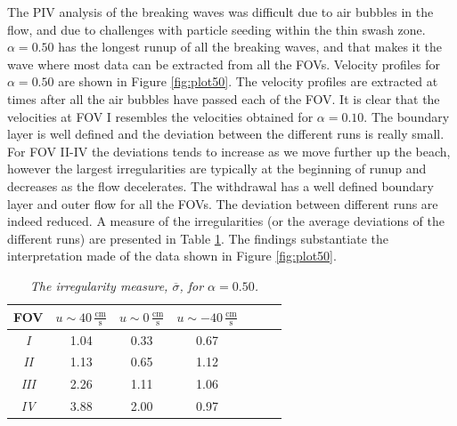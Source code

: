 \documentclass[review, authoryear]{elsarticle}
\newcommand{\cmbps}{\,\frac{\mbox{cm}}{\mbox{s}}}
\begin{document}
The PIV analysis of the breaking waves was difficult due to air bubbles in the flow, and due to challenges with particle seeding within the thin swash zone.  $\alpha=0.50$ has the longest runup of all the breaking waves, and that makes it the wave where most data can be extracted from all the FOVs. Velocity profiles for $\alpha=0.50$ are shown in Figure \ref{fig:plot50}. The velocity profiles are extracted at times after all the air bubbles have passed each of the FOV. It is clear that the velocities at FOV I resembles the velocities obtained for $\alpha=0.10$. The boundary layer is well defined and the deviation between the different runs is really small. For FOV II-IV the deviations tends to increase as we move further up the beach, however the largest irregularities are typically at the beginning of runup and decreases as the flow decelerates. The withdrawal has a well defined boundary layer and outer flow for all the FOVs. The deviation between different runs are indeed reduced. A measure of the irregularities (or the average deviations of the different runs) are presented in Table \ref{tab:irr}. The findings substantiate the interpretation made of the data shown in Figure \ref{fig:plot50}.


\begin{table}[]
\caption{\textit{The irregularity measure, $\overline{\sigma}$, for $\alpha=0.50$.}}
\centering
\begin{tabular}{ccccccc}
\hline
FOV& $  u\sim40\cmbps$  &$ u\sim 0\cmbps$ & $u\sim -40\cmbps$   \\ \hline
\textit{I}  & 1.04   &    0.33  & 0.67                       \\
\textit{II}  & 1.13   &    0.65   & 1.12                    \\
\textit{III} &  2.26   &    1.11 &  1.06                            \\
\textit{IV}  & 3.88    &   2.00  & 0.97                 \\
\end{tabular}
\label{tab:irr}
\end{table}
\end{document}
